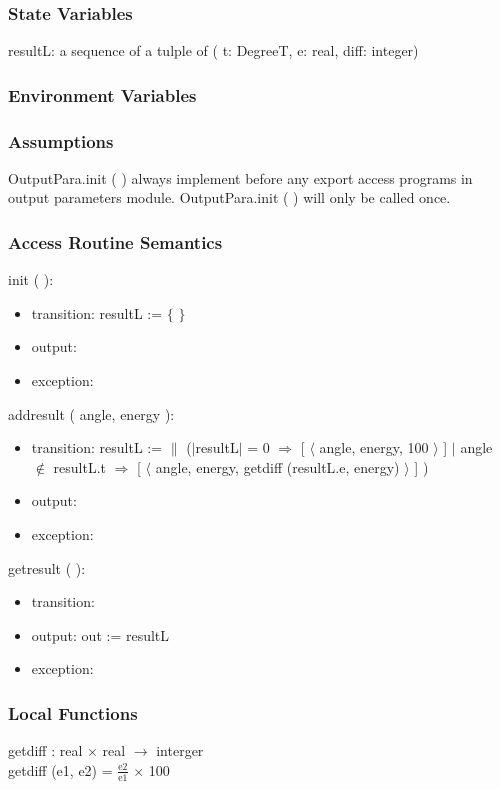 \documentclass[12pt, titlepage]{article}
\begin{document}
\subsubsection{State Variables}
resultL: a sequence of a tulple of ( t: DegreeT, e: real, diff: integer)\\


\subsubsection{Environment Variables}


\subsubsection{Assumptions}
OutputPara.init ( ) always implement before any export access programs in output parameters module.
OutputPara.init ( ) will only be called once.

\subsubsection{ Access Routine Semantics}

\noindent  init ( ):
\begin{itemize}
\item transition: resultL := $\{ $ $ \}$
\item output:
\item exception: 
\end{itemize}

\noindent  addresult ( angle, energy ):
\begin{itemize}
\item transition: resultL := $\|$ ($|$resultL$|$ = 0 $\Rightarrow$ [ $\langle$ angle, energy, 100 $\rangle$ ] $|$ angle $\notin$ resultL.t $\Rightarrow$ [ $\langle$ angle, energy, getdiff (resultL.e, energy) $\rangle$ ] )
\item output:
\item exception: 
\end{itemize}

\noindent  getresult (  ):
\begin{itemize}
\item transition: 
\item output: out := resultL
\item exception: 
\end{itemize}


\subsubsection{Local Functions}
getdiff : real $\times$ real $\rightarrow$ interger\\
getdiff (e1, e2) =
$\frac{\text{e2}}{\text{e1}}$ $\times$ 100
\end{document}
